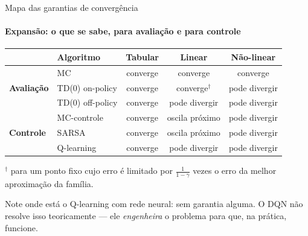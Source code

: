 \documentclass[aspectratio=169, 11pt]{beamer}
\begin{document}
\begin{frame}{Mapa das garantias de convergência}
  \framesubtitle{Expansão: o que se sabe, para avaliação e para controle}

  \begin{center}\small
  \begin{tabular}{llccc}
    \toprule
    & Algoritmo & Tabular & Linear & Não-linear \\
    \midrule
    \multirow{3}{*}{\textbf{Avaliação}}
      & MC              & converge & converge & converge \\
      & TD(0) on-policy & converge & converge$^{\dagger}$ & pode divergir \\
      & TD(0) off-policy& converge & pode divergir & pode divergir \\
    \midrule
    \multirow{3}{*}{\textbf{Controle}}
      & MC-controle     & converge & oscila próximo & pode divergir \\
      & SARSA           & converge & oscila próximo & pode divergir \\
      & Q-learning      & converge & pode divergir & pode divergir \\
    \bottomrule
  \end{tabular}
  \end{center}

  {\footnotesize $^{\dagger}$ para um ponto fixo cujo erro é limitado por
  $\frac{1}{1-\gamma}$ vezes o erro da melhor aproximação da família.}

  \vspace{-0.5em}
  \begin{ideiabox}
    Note onde está o Q-learning com rede neural: sem garantia alguma. O DQN
    não resolve isso teoricamente --- ele \emph{engenheira} o problema para
    que, na prática, funcione.
  \end{ideiabox}
\end{frame}
\end{document}
